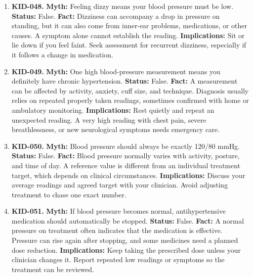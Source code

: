 \documentclass[11pt,oneside]{book}
\begin{document}
\begin{enumerate}[leftmargin=0pt,labelwidth=0pt,labelsep=0pt,itemindent=0pt]
\item[] \textbf{KID-048.} \textbf{Myth:} Feeling dizzy means your blood pressure must be low.\newline
\textbf{Status:} False.\newline
\textbf{Fact:} Dizziness can accompany a drop in pressure on standing, but it can also come from inner-ear problems, medications, or other causes. A symptom alone cannot establish the reading. \cite{ref361}\newline
\textbf{Implications:} Sit or lie down if you feel faint. Seek assessment for recurrent dizziness, especially if it follows a change in medication.
\item[] \textbf{KID-049.} \textbf{Myth:} One high blood-pressure measurement means you definitely have chronic hypertension.\newline
\textbf{Status:} False.\newline
\textbf{Fact:} A measurement can be affected by activity, anxiety, cuff size, and technique. Diagnosis usually relies on repeated properly taken readings, sometimes confirmed with home or ambulatory monitoring. \cite{ref360}\newline
\textbf{Implications:} Rest quietly and repeat an unexpected reading. A very high reading with chest pain, severe breathlessness, or new neurological symptoms needs emergency care.
\item[] \textbf{KID-050.} \textbf{Myth:} Blood pressure should always be exactly 120/80 mmHg.\newline
\textbf{Status:} False.\newline
\textbf{Fact:} Blood pressure normally varies with activity, posture, and time of day. A reference value is different from an individual treatment target, which depends on clinical circumstances. \cite{ref360}\newline
\textbf{Implications:} Discuss your average readings and agreed target with your clinician. Avoid adjusting treatment to chase one exact number.
\item[] \textbf{KID-051.} \textbf{Myth:} If blood pressure becomes normal, antihypertensive medication should automatically be stopped.\newline
\textbf{Status:} False.\newline
\textbf{Fact:} A normal pressure on treatment often indicates that the medication is effective. Pressure can rise again after stopping, and some medicines need a planned dose reduction. \cite{ref360}\newline
\textbf{Implications:} Keep taking the prescribed dose unless your clinician changes it. Report repeated low readings or symptoms so the treatment can be reviewed.

\end{enumerate}
\end{document}
